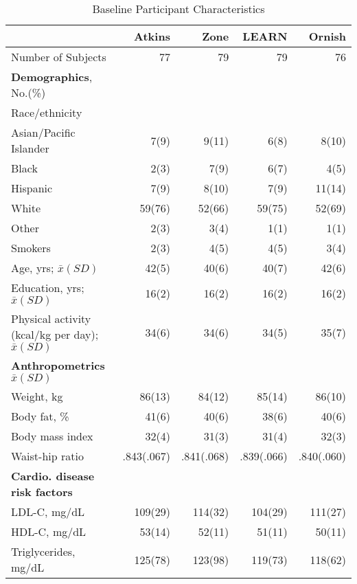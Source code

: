 \documentclass[11pt]{book}\usepackage[]{graphicx}\usepackage[]{color}
\begin{document}
\begin{table}[ht] 
\caption{Baseline Participant Characteristics}
\begin{tabular}{@{} lrrrr @{}} \hline
         & Atkins & Zone & LEARN & Ornish \\ \hline
Number of Subjects       & 77     & 79   &    79 &  76 \\
\textbf{Demographics}, No.(\%)  &  &  &  &  \\
Race/ethnicity &  &  &  &  \\
\hspace{3mm} Asian/Pacific Islander & 7(9) & 9(11) & 6(8) & 8(10) \\
\hspace{3mm} Black                  & 2(3) & 7(9)  & 6(7) & 4(5) \\
\hspace{3mm} Hispanic               & 7(9) & 8(10) & 7(9) & 11(14) \\
\hspace{3mm} White                  & 59(76) & 52(66) & 59(75) & 52(69) \\
\hspace{3mm} Other                  & 2(3)   & 3(4)   & 1(1)   & 1(1) \\
Smokers      & 2(3)   & 4(5)   & 4(5)   & 3(4) \\
Age, yrs; $\bar{x} (SD)$ & 42(5) & 40(6) & 40(7) & 42(6) \\
Education, yrs; $\bar{x} (SD)$ & 16(2) & 16(2) & 16(2) & 16(2) \\
Physical activity {\scriptsize{(kcal/kg per day)}}; $\bar{x} (SD)$     & 34(6)  & 34(6)  & 34(5)  & 35(7) \\
\textbf{Anthropometrics} $\bar{x} (SD)$   &  &  &  & \\
Weight, kg             & 86(13) & 84(12) & 85(14) & 86(10) \\
Body fat, \%           & 41(6)  & 40(6)  & 38(6)  & 40(6) \\
Body mass index        & 32(4)  & 31(3)  & 31(4)  & 32(3) \\
Waist-hip ratio        & .843(.067) & .841(.068) & .839(.066) & .840(.060) \\
\textbf{Cardio. disease risk factors} & & & & \\
LDL-C, mg/dL           & 109(29) & 114(32) & 104(29) & 111(27) \\
HDL-C, mg/dL           & 53(14)  & 52(11)  & 51(11) & 50(11) \\
Triglycerides, mg/dL   & 125(78) & 123(98) & 119(73) & 118(62) \\

\end{tabular}
\end{table}
\end{document}
